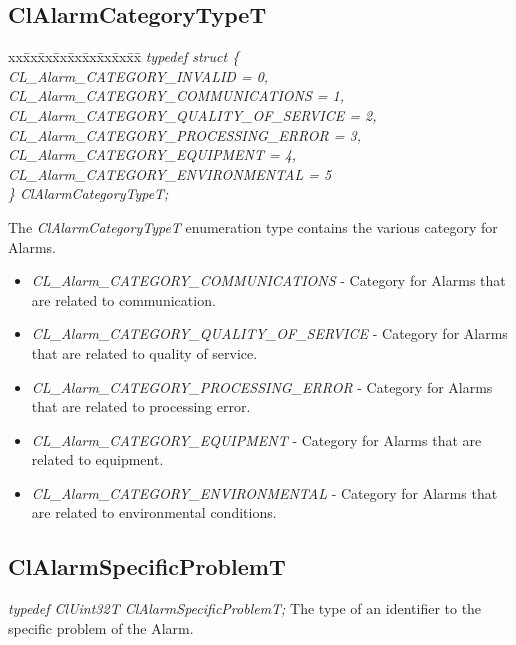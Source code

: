 \begin{flushleft}
\subsection{ClAlarmCategoryTypeT}
\begin{tabbing}
xx\=xx\=xx\=xx\=xx\=xx\=xx\=xx\=xx\=\kill
\textit{typedef struct \{}\\
\>\>\>\>\textit{CL\_Alarm\_CATEGORY\_INVALID = 0,}\\
\>\>\>\>\textit{CL\_Alarm\_CATEGORY\_COMMUNICATIONS = 1,}\\
\>\>\>\>\textit{CL\_Alarm\_CATEGORY\_QUALITY\_OF\_SERVICE = 2,}\\
\>\>\>\>\textit{CL\_Alarm\_CATEGORY\_PROCESSING\_ERROR = 3,}\\
\>\>\>\>\textit{CL\_Alarm\_CATEGORY\_EQUIPMENT = 4,}\\
\>\>\>\>\textit{CL\_Alarm\_CATEGORY\_ENVIRONMENTAL = 5}\\
\textit{\} ClAlarmCategoryTypeT;}\end{tabbing}
The \textit{ClAlarmCategoryTypeT} enumeration type contains the various category for Alarms.
\begin{itemize}
\item
\textit{CL\_\-Alarm\_\-CATEGORY\_\-COMMUNICATIONS} - Category for Alarms that are related to communication.
\item
\textit{CL\_\-Alarm\_\-CATEGORY\_\-QUALITY\_\-OF\_\-SERVICE} - Category for Alarms that are related to
quality of service.
\item
\textit{CL\_\-Alarm\_\-CATEGORY\_\-PROCESSING\_\-ERROR} - Category for Alarms that are related to
processing error.
\item
\textit{CL\_\-Alarm\_\-CATEGORY\_\-EQUIPMENT} - Category for Alarms that are related to equipment.
\item
\textit{CL\_\-Alarm\_\-CATEGORY\_\-ENVIRONMENTAL} - Category for Alarms that are related to environmental
conditions.
\end{itemize}



\subsection{ClAlarmSpecificProblemT}
\textit{typedef ClUint32T ClAlarmSpecificProblemT;}
\newline
\newline
 The type of an identifier to the specific problem of the Alarm.




\end{flushleft}
